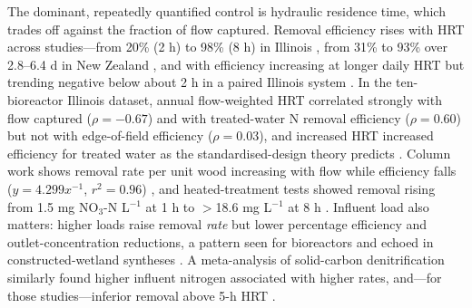 \documentclass[11pt]{article}
\begin{document}
The dominant, repeatedly quantified control is hydraulic residence time, which trades off against the fraction of flow captured. Removal efficiency rises with HRT across studies---from 20\% (2 h) to 98\% (8 h) in Illinois \parencite{Bell2015}, from 31\% to 93\% over 2.8--6.4 d in New Zealand \parencite{Rivas2020}, and with efficiency increasing at longer daily HRT but trending negative below about 2 h in a paired Illinois system \parencite{Maxwell2022}. In the ten-bioreactor Illinois dataset, annual flow-weighted HRT correlated strongly with flow captured ($\rho=-0.67$) and with treated-water N removal efficiency ($\rho=0.60$) but not with edge-of-field efficiency ($\rho=0.03$), and increased HRT increased efficiency for treated water as the standardised-design theory predicts \parencite{Christianson2026}. Column work shows removal rate per unit wood increasing with flow while efficiency falls ($y=4.299x^{-1}$, $r^2=0.96$) \parencite{Greenan2009}, and heated-treatment tests showed removal rising from 1.5 mg NO$_3$-N L$^{-1}$ at 1 h to $>$18.6 mg L$^{-1}$ at 8 h \parencite{Ma2021}. Influent load also matters: higher loads raise removal \emph{rate} but lower percentage efficiency and outlet-concentration reductions, a pattern seen for bioreactors \parencite{Rivas2020,Christianson2026} and echoed in constructed-wetland syntheses \parencite{Mendes2021}. A meta-analysis of solid-carbon denitrification similarly found higher influent nitrogen associated with higher rates, and---for those studies---inferior removal above 5-h HRT \parencite{Zhang2021b}.
\end{document}
